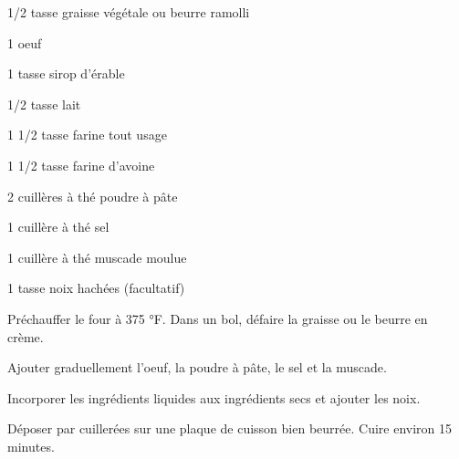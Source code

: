 


\totaltime{}


\begin{ingredients}
    \item 1/2 tasse graisse végétale ou beurre ramolli
    \item 1 oeuf
    \item 1 tasse sirop d'érable
    \item 1/2 tasse lait
    \item 1 1/2 tasse farine tout usage
    \item 1 1/2 tasse farine d'avoine
    \item 2 cuillères à thé poudre à pâte
    \item 1 cuillère à thé sel
    \item 1 cuillère à thé muscade moulue
    \item 1 tasse noix hachées (facultatif)
\end{ingredients}

\begin{steps}
    \item Préchauffer le four à 375 °F. Dans un bol, défaire la graisse ou le beurre en crème.
    \item Ajouter graduellement l'oeuf, la poudre à pâte, le sel et la muscade.
    \item Incorporer les ingrédients liquides aux ingrédients secs et ajouter les noix.
    \item Déposer par cuillerées sur une plaque de cuisson bien beurrée. Cuire environ 15 minutes.
\end{steps}
